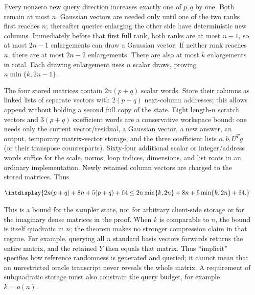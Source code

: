 
Every nonzero new query direction increases exactly one of \(p,\allowbreak q\) by one. Both remain at most \(n\). Gaussian vectors are needed only until one of the two ranks first reaches \(n\); thereafter queries enlarging the other side have deterministic new columns. Immediately before that first full rank, both ranks are at most \(n-1\), so at most \(2n-1\) enlargements can draw a Gaussian vector. If neither rank reaches \(n\), there are at most \(2n-2\) enlargements. There are also at most \(k\) enlargements in total. Each drawing enlargement uses \(n\) scalar draws, proving \(n\min\{k,\allowbreak 2n-1\}\).



The four stored matrices contain \(2n(p+q)\) scalar words. Store their columns as linked lists of separate vectors with \(2(p+q)\) next-column addresses; this allows append without holding a second full copy of the state. Eight length-\(n\) scratch vectors and \(3(p+q)\) coefficient words are a conservative workspace bound: one needs only the current vector/residual, a Gaussian vector, a new answer, an output, temporary matrix-vector storage, and the three coefficient lists \(a,\allowbreak b,\allowbreak U^Tg\) (or their transpose counterparts). Sixty-four additional scalar or integer/address words suffice for the scale, norms, loop indices, dimensions, and list roots in an ordinary implementation. Newly retained column vectors are charged to the stored matrices. Thus


\begingroup\renewcommand{\theHequation}{intdisplay.1077}
\begin{equation*}
\intdisplay{
2n(p+q)+8n+5(p+q)+64
 \leq 2n\min\{k,2n\}+8n+5\min\{k,2n\}+64.
}
\end{equation*}
\endgroup


This is a bound for the sampler state, not for arbitrary client-side storage or for the imaginary dense matrices in the proof. When \(k\) is comparable to \(n\), the bound is itself quadratic in \(n\); the theorem makes no stronger compression claim in that regime. For example, querying all \(n\) standard basis vectors forwards returns the entire matrix, and the retained \(Y\) then equals that matrix. Thus ``implicit'' specifies how reference randomness is generated and queried; it cannot mean that an unrestricted oracle transcript never reveals the whole matrix. A requirement of subquadratic storage must also constrain the query budget, for example \(k=o(n)\).


